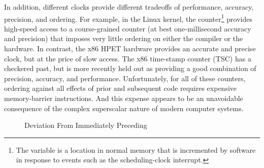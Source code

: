 In addition, different clocks provide different tradeoffs of performance,
accuracy, precision, and ordering.
For example, in the Linux kernel, the  counter\footnote{
	The  variable is a location in normal memory that
	is incremented by software in response to events such as the
	scheduling-clock interrupt.}
provides high-speed access to a course-grained counter (at best
one-millisecond accuracy and precision) that imposes very little ordering
on either the compiler or the hardware.
In contrast, the x86 HPET hardware provides an accurate and
precise clock, but at the price of slow access.
The x86 time-stamp counter (TSC) has a checkered past, but is more
recently held out as providing a good combination of precision, accuracy,
and performance.
Unfortunately, for all of these counters, ordering against all effects
of prior and subsequent code requires expensive memory-barrier instructions.
And this expense appears to be an unavoidable consequence of the
complex superscalar nature of modern computer systems.

\begin{figure}
\centering
{}
\caption{ Deviation From Immediately Preceding }
\label{fig:app:questions:clock-gettime(CLOCK-REALTIME) Deviation From Immediately Preceding clock-gettime(CLOCK-MONOTONIC)}
\end{figure}

